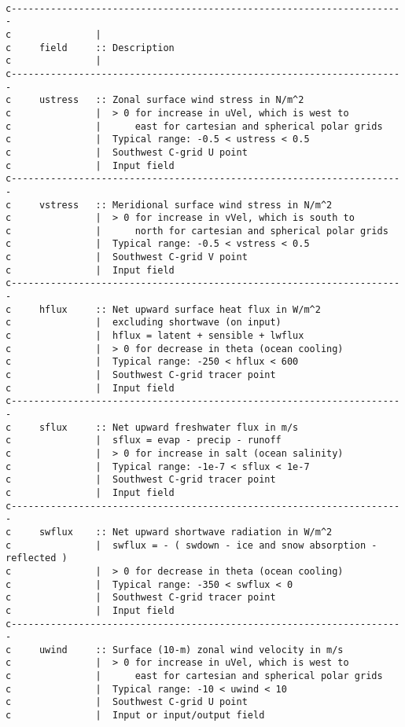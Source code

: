 {\scriptsize
\begin{verbatim}

c----------------------------------------------------------------------
c               |
c     field     :: Description
c               |
c----------------------------------------------------------------------
c     ustress   :: Zonal surface wind stress in N/m^2
c               |  > 0 for increase in uVel, which is west to
c               |      east for cartesian and spherical polar grids
c               |  Typical range: -0.5 < ustress < 0.5
c               |  Southwest C-grid U point
c               |  Input field
c----------------------------------------------------------------------
c     vstress   :: Meridional surface wind stress in N/m^2
c               |  > 0 for increase in vVel, which is south to
c               |      north for cartesian and spherical polar grids
c               |  Typical range: -0.5 < vstress < 0.5
c               |  Southwest C-grid V point
c               |  Input field
c----------------------------------------------------------------------
c     hflux     :: Net upward surface heat flux in W/m^2 
c               |  excluding shortwave (on input)
c               |  hflux = latent + sensible + lwflux
c               |  > 0 for decrease in theta (ocean cooling)
c               |  Typical range: -250 < hflux < 600
c               |  Southwest C-grid tracer point
c               |  Input field
c----------------------------------------------------------------------
c     sflux     :: Net upward freshwater flux in m/s
c               |  sflux = evap - precip - runoff
c               |  > 0 for increase in salt (ocean salinity)
c               |  Typical range: -1e-7 < sflux < 1e-7
c               |  Southwest C-grid tracer point
c               |  Input field
c----------------------------------------------------------------------
c     swflux    :: Net upward shortwave radiation in W/m^2
c               |  swflux = - ( swdown - ice and snow absorption - reflected )
c               |  > 0 for decrease in theta (ocean cooling)
c               |  Typical range: -350 < swflux < 0
c               |  Southwest C-grid tracer point
c               |  Input field
c----------------------------------------------------------------------
c     uwind     :: Surface (10-m) zonal wind velocity in m/s
c               |  > 0 for increase in uVel, which is west to
c               |      east for cartesian and spherical polar grids
c               |  Typical range: -10 < uwind < 10
c               |  Southwest C-grid U point
c               |  Input or input/output field

\end{verbatim}}
